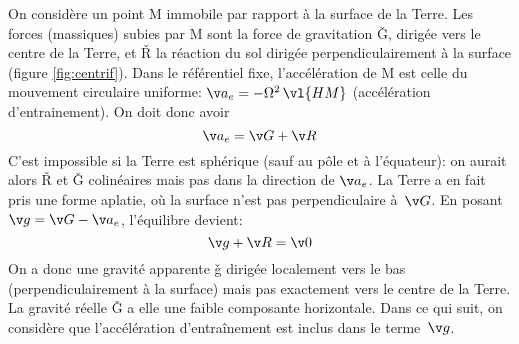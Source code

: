 \sk
On considère un point M immobile par rapport à la surface de la Terre. Les forces (massiques) subies par M sont la force de gravitation \v G, dirigée vers le centre de la Terre, et \v R la réaction du sol dirigée perpendiculairement à la surface (figure \ref{fig:centrif}). Dans le référentiel fixe, l'accélération de M est celle du mouvement circulaire uniforme: $\v a_e = - \Omega^2 \, \vl{HM}$ (accélération d'entrainement). On doit donc avoir \[\v a_e=\v G+\v R\] 
C'est impossible si la Terre est sphérique (sauf au pôle et à l'équateur): on aurait alors \v R et \v G colinéaires mais pas dans la direction de $\v a_e$. La Terre a en fait pris une forme aplatie, où la surface n'est pas perpendiculaire à~$\v G$. En posant $\v g=\v G-\v a_e$, l'équilibre devient: \[\v g+\v R=\v 0\] On a donc une gravité apparente \v g dirigée localement vers le bas (perpendiculairement à la surface) mais pas exactement vers le centre de la Terre. La gravité réelle \v G a elle une faible composante horizontale. Dans ce qui suit, on considère que l'accélération d'entraînement est inclus dans le terme~$\v g$.



